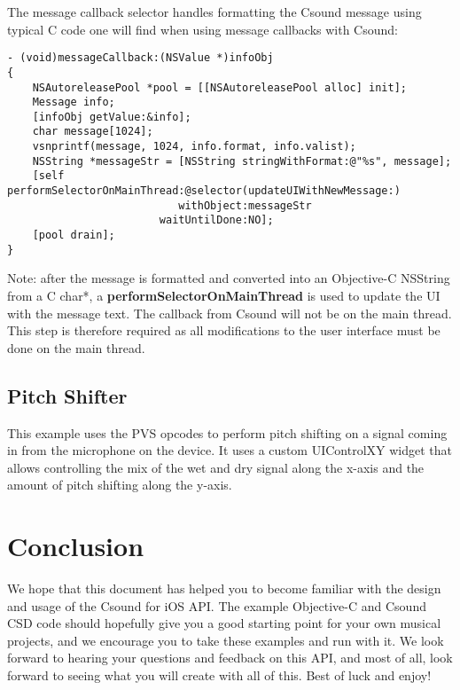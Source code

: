 \documentclass[11pt]{article}
\begin{document}
The message callback selector handles formatting the Csound message using typical C code one will find when using message callbacks with Csound:

\begin{lstlisting}[caption=Message Callback Selector Code]
- (void)messageCallback:(NSValue *)infoObj
{
    NSAutoreleasePool *pool = [[NSAutoreleasePool alloc] init];
    Message info;
    [infoObj getValue:&info];
    char message[1024];
    vsnprintf(message, 1024, info.format, info.valist);
    NSString *messageStr = [NSString stringWithFormat:@"%s", message];
    [self performSelectorOnMainThread:@selector(updateUIWithNewMessage:)
                           withObject:messageStr
                        waitUntilDone:NO];
    [pool drain];
}
\end{lstlisting}

Note: after the message is formatted and converted into an Objective-C NSString from a C char*, a \textbf{performSelectorOnMainThread} is used to update the UI with the message text.  The callback from Csound will not be on the main thread. This step is therefore required as all modifications to the user interface must be done on the main thread. 

\subsection{Pitch Shifter}

This example uses the PVS opcodes to perform pitch shifting on a signal coming in from the microphone on the device.  It uses a custom UIControlXY widget that allows controlling the mix of the wet and dry signal along the x-axis and the amount of pitch shifting along the y-axis.  


\section{Conclusion}

We hope that this document has helped you to become familiar with the design and usage of the Csound for iOS API. The example Objective-C and Csound CSD code should hopefully give you a good starting point for your own musical projects, and we encourage you to take these examples and run with it.  We look forward to hearing your questions and feedback on this API, and most of all, look forward to seeing what you will create with all of this.  Best of luck and enjoy! 
\end{document}
